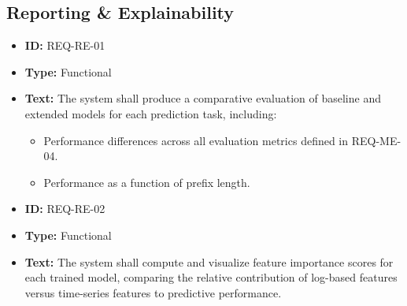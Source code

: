 \documentclass[runningheads]{llncs}
\begin{document}
\subsection{Reporting \& Explainability}
\begin{itemize}
    \item \textbf{ID:} REQ-RE-01
    \item \textbf{Type:} Functional
    \item \textbf{Text:} The system shall produce a comparative evaluation of baseline and extended models for each prediction task, including:
          \begin{itemize}
              \item Performance differences across all evaluation metrics defined in REQ-ME-04.
              \item Performance as a function of prefix length.
          \end{itemize}

          \vspace{1em}
    \item \textbf{ID:} REQ-RE-02
    \item \textbf{Type:} Functional
    \item \textbf{Text:} The system shall compute and visualize feature importance scores for each trained model, comparing the relative contribution of log-based features versus time-series features to predictive performance.

\end{itemize}
\end{document}
